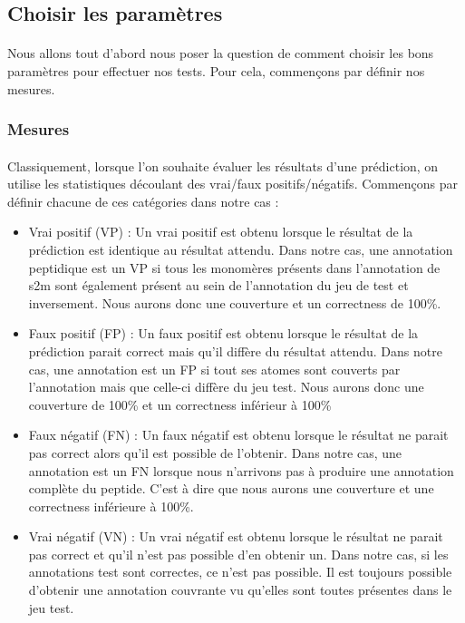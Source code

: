 \documentclass[12pt,french,twoside]{report}
\begin{document}
\subsection{Choisir les paramètres}

\paragraph{}Nous allons tout d'abord nous poser la question de comment choisir les bons paramètres pour effectuer nos tests.
Pour cela, commençons par définir nos mesures.

\subsubsection{Mesures}

\paragraph{}Classiquement, lorsque l'on souhaite évaluer les résultats d'une prédiction, on utilise les statistiques découlant des vrai/faux positifs/négatifs.
Commençons par définir chacune de ces catégories dans notre cas :
\begin{itemize}
 \item Vrai positif (VP) : Un vrai positif est obtenu lorsque le résultat de la prédiction est identique au résultat attendu.
Dans notre cas, une annotation peptidique est un VP si tous les monomères présents dans l'annotation de s2m sont également présent au sein de l'annotation du jeu de test et inversement.
Nous aurons donc une couverture et un correctness de 100\%.
 \item Faux positif (FP) : Un faux positif est obtenu lorsque le résultat de la prédiction parait correct mais qu'il diffère du résultat attendu.
Dans notre cas, une annotation est un FP si tout ses atomes sont couverts par l'annotation mais que celle-ci diffère du jeu test.
Nous aurons donc une couverture de 100\% et un correctness inférieur à 100\%
 \item Faux négatif (FN) : Un faux négatif est obtenu lorsque le résultat ne parait pas correct alors qu'il est possible de l'obtenir.
Dans notre cas, une annotation est un FN lorsque nous n'arrivons pas à produire une annotation complète du peptide.
C'est à dire que nous aurons une couverture et une correctness inférieure à 100\%.
 \item Vrai négatif (VN) : Un vrai négatif est obtenu lorsque le résultat ne parait pas correct et qu'il n'est pas possible d'en obtenir un.
Dans notre cas, si les annotations test sont correctes, ce n'est pas possible.
Il est toujours possible d'obtenir une annotation couvrante vu qu'elles sont toutes présentes dans le jeu test.
\end{itemize}
\end{document}
